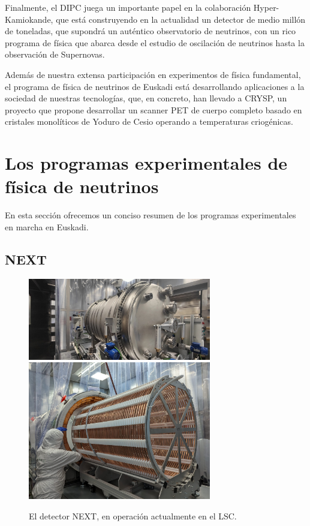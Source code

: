 \documentclass[12pt,a4paper,article]{report} %
\begin{document}
Finalmente, el DIPC juega un importante papel en la colaboración Hyper-Kamiokande, que está construyendo en la actualidad un detector de medio millón de toneladas, que supondrá un auténtico observatorio de neutrinos, con un rico programa de física que abarca desde el estudio de oscilación de neutrinos hasta la observación de Supernovas.

Además de nuestra extensa participación en experimentos de física fundamental, el programa de física de neutrinos de Euskadi está desarrollando aplicaciones a la sociedad de nuestras tecnologías, que, en concreto, han llevado a CRYSP, un proyecto que propone desarrollar un scanner PET de cuerpo completo basado en cristales monolíticos de Yoduro de Cesio operando a temperaturas criogénicas.



\section*{Los programas experimentales de física de neutrinos}

En esta sección ofrecemos un conciso resumen de los programas experimentales en marcha en Euskadi. 

\subsection*{NEXT}

\begin{figure}[bht!]
\begin{center}
\includegraphics[width=8cm]{img/next100-vessel.jpeg}
\includegraphics[width=8cm]{img/next-100-fc.jpg}
\caption{El detector NEXT, en operación actualmente en el LSC.}
\label{fig:xess}
\end{center}
\end{figure}
\end{document}
